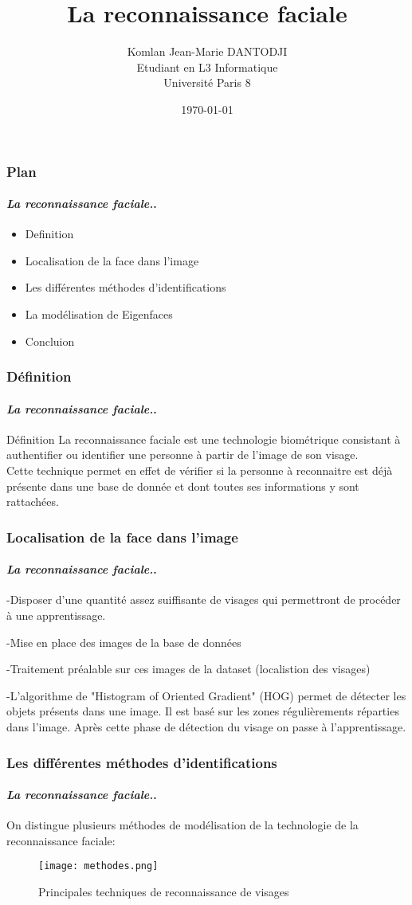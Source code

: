 \documentclass{beamer}
\title{La reconnaissance faciale}
\author{Komlan Jean-Marie DANTODJI \\Etudiant en L3 Informatique \\Université Paris 8}
\date{\today}
\begin{document}
\frame{\titlepage}
	\begin{frame}
		\frametitle{Plan}
		\framesubtitle{\textit{La reconnaissance faciale.}.}
		\begin{itemize}
			\item Definition
			\item Localisation de la face dans l’image
			\item Les différentes méthodes d’identifications
			\item La modélisation de Eigenfaces
			\item Concluion
		\end{itemize}
	\end{frame}
	\begin{frame}
		\frametitle{Définition}
		\framesubtitle{\textit{La reconnaissance faciale.}.}
		\begin{block}{Définition}
			La reconnaissance faciale est une technologie biométrique consistant à authentifier ou identifier une personne à partir de l’image de son visage.\\
Cette technique permet en effet de vérifier si la personne à reconnaitre est déjà présente dans une base de donnée et dont toutes ses informations y sont rattachées.                                  

		\end{block}
	\end{frame}
	\begin{frame}
		\frametitle{Localisation de la face dans l’image}
		\framesubtitle{\textit{La reconnaissance faciale.}.}
		\begin{block}{}
	\par -Disposer d'une quantité assez suiffisante de visages qui permettront de procéder à une apprentissage.	
	\par -Mise en place des images de la base de données
	\par -Traitement préalable sur ces images de la dataset (localistion des visages)
	\par -L'algorithme de "Histogram of Oriented Gradient" (HOG) permet de détecter les objets présents dans une image.
Il est basé sur les zones régulièrements réparties dans l'image.
Après cette phase de détection du visage on passe à l'apprentissage. 
		\end{block}
	\end{frame}
	\begin{frame}
		\frametitle{Les différentes méthodes d’identifications}
		\framesubtitle{\textit{La reconnaissance faciale.}.}
		\begin{block}{}
On distingue plusieurs méthodes de modélisation de la technologie de la reconnaissance faciale:
\begin{figure}[H]
    \texttt{[image: methodes.png]}
    \caption{Principales techniques de reconnaissance de visages}
    \label{fig:L1}
\end{figure}

		\end{block}
	\end{frame}
\end{document}
